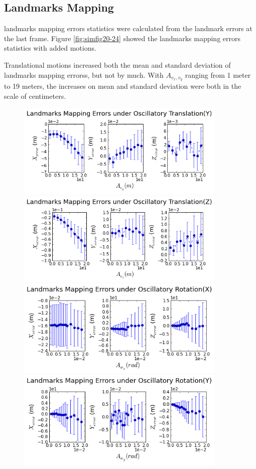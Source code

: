 \subsection{Landmarks Mapping}\label{sec:landmarkMotion}
landmarks mapping errors statistics were calculated from the landmark
errors at the last frame. Figure \ref{fig:simfig20-24} showed the
landmarks mapping errors statistics with added motions. 

Translational motions increased both the mean and standard deviation
of landmarks mapping errorss, but not by much. With $A_{v_x, v_y}$
ranging from 1 meter to 19 meters, the increases on mean and standard
deviation were both in the scale of centimeters.

\begin{figure}[h]
  \centering
  \includegraphics[width=10cm, keepaspectratio=true]{./Figures/SimulationFigures/Figure20.png}
  \includegraphics[width=10cm, keepaspectratio=true]{./Figures/SimulationFigures/Figure21.png}
  \includegraphics[width=10cm, keepaspectratio=true]{./Figures/SimulationFigures/Figure22.png}
  \includegraphics[width=10cm, keepaspectratio=true]{./Figures/SimulationFigures/Figure23.png}

\end{figure}
